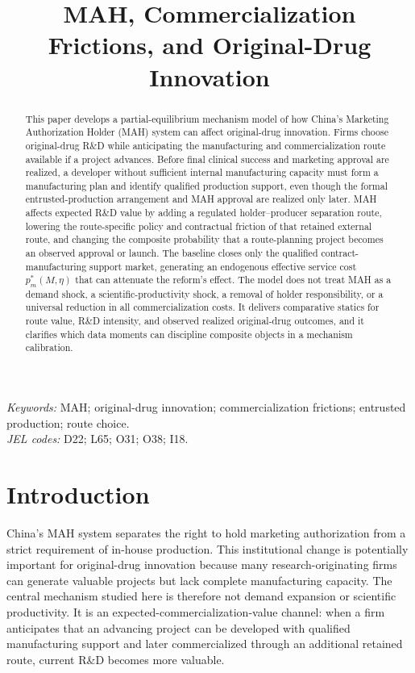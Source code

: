 \documentclass[12pt]{article}
\title{MAH, Commercialization Frictions, and Original-Drug Innovation}
\author{}
\date{}
\newcommand{\1}{\mathbf{1}}
\begin{document}
\maketitle
\thispagestyle{plain}

\begin{abstract}
\noindent
This paper develops a partial-equilibrium mechanism model of how China's Marketing Authorization Holder (MAH) system can affect original-drug innovation. Firms choose original-drug R\&D while anticipating the manufacturing and commercialization route available if a project advances. Before final clinical success and marketing approval are realized, a developer without sufficient internal manufacturing capacity must form a manufacturing plan and identify qualified production support, even though the formal entrusted-production arrangement and MAH approval are realized only later. MAH affects expected R\&D value by adding a regulated holder--producer separation route, lowering the route-specific policy and contractual friction of that retained external route, and changing the composite probability that a route-planning project becomes an observed approval or launch. The baseline closes only the qualified contract-manufacturing support market, generating an endogenous effective service cost $p_m^*(M,\eta)$ that can attenuate the reform's effect. The model does not treat MAH as a demand shock, a scientific-productivity shock, a removal of holder responsibility, or a universal reduction in all commercialization costs. It delivers comparative statics for route value, R\&D intensity, and observed realized original-drug outcomes, and it clarifies which data moments can discipline composite objects in a mechanism calibration.
\end{abstract}

\noindent\textit{Keywords:} MAH; original-drug innovation; commercialization frictions; entrusted production; route choice.\\
\noindent\textit{JEL codes:} D22; L65; O31; O38; I18.

\section{Introduction}

China's MAH system separates the right to hold marketing authorization from a strict requirement of in-house production. This institutional change is potentially important for original-drug innovation because many research-originating firms can generate valuable projects but lack complete manufacturing capacity. The central mechanism studied here is therefore not demand expansion or scientific productivity. It is an expected-commercialization-value channel: when a firm anticipates that an advancing project can be developed with qualified manufacturing support and later commercialized through an additional retained route, current R\&D becomes more valuable.
\end{document}
